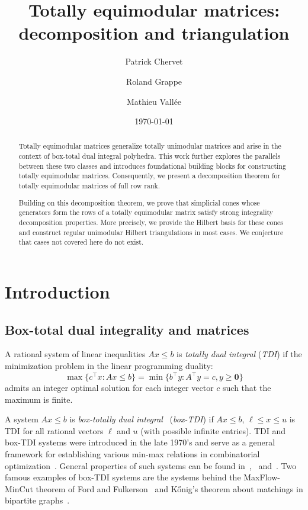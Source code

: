 \documentclass[11pt,a4paper]{amsart}
\title{Totally equimodular matrices: decomposition and triangulation}
\author{Patrick Chervet}
\author{Roland Grappe}
\author{Mathieu Vall\'ee}
\date{\today}
\renewcommand*{\geq}{\geqslant}
\renewcommand*{\leq}{\leqslant}
\theoremstyle{plain}
\theoremstyle{definition}
\begin{document}
\begin{abstract}
	Totally equimodular matrices generalize totally unimodular matrices and arise in the context of box-total dual integral polyhedra. 
	This work further explores the parallels between these two classes and introduces foundational building blocks for constructing totally equimodular matrices. 
	Consequently, we present a decomposition theorem for totally equimodular matrices of full row rank.
	
	Building on this decomposition theorem, we prove that simplicial cones whose generators form the rows of a totally equimodular matrix sa\-tisfy strong integrality decomposition properties.		
	More precisely, we provide the Hilbert basis for these cones and construct regular unimodular Hilbert triangulations in most cases. 
	We conjecture that cases not covered here do not exist.
\end{abstract}
	{\let\newpage\relax\maketitle}
	
\section{Introduction}

\subsection{Box-total dual integrality and matrices}

A rational system of linear inequalities $Ax\leq b$ is \emph{totally dual integral} (\emph{TDI}) if the minimization problem in the linear programming duality:
\begin{equation*}
	\max\{c^\top x\colon Ax\leq b\}=\min\{b^\top y\colon A^\top y = c, y\geq\mathbf{0}\}
\end{equation*}
admits an integer optimal solution for each integer vector $c$ such that the maximum is finite.

A system $Ax \leq b$ is \emph{box-totally dual integral}~\cite{Edmonds_Giles_1977} (\emph{box-TDI}) if $Ax\leq b$, $\ell\leq x\leq u$ is TDI for all rational vectors $\ell$ and $u$ (with possible infinite entries).
TDI and box-TDI systems were introduced in the late 1970's and serve as a general framework for establishing various min-max relations in combinatorial optimization~\cite{Schrijver_2003}.
General properties of such systems can be found in~\cite{Cook_1986},~\cite[Chap.~5.20]{Schrijver_2003} and~\cite[Chap.~22.4]{Schrijver_1999}.
Two famous examples of box-TDI systems are the systems behind the MaxFlow-MinCut theorem of Ford and Fulkerson~\cite{Ford_Fulkerson_1956} and K\H onig's theorem about matchings in bipartite graphs~\cite{Konig_1931}.
\end{document}
